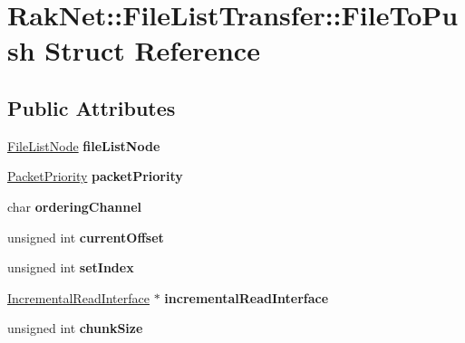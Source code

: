 \hypertarget{struct_rak_net_1_1_file_list_transfer_1_1_file_to_push}{\section{Rak\-Net\-:\-:File\-List\-Transfer\-:\-:File\-To\-Push Struct Reference}
\label{struct_rak_net_1_1_file_list_transfer_1_1_file_to_push}
}
\subsection*{Public Attributes}
\begin{DoxyCompactItemize}
\item 
\hypertarget{struct_rak_net_1_1_file_list_transfer_1_1_file_to_push_a57452c05bc0205c19324ca196ad2d220}{\hyperlink{struct_rak_net_1_1_file_list_node}{File\-List\-Node} {\bfseries file\-List\-Node}}\label{struct_rak_net_1_1_file_list_transfer_1_1_file_to_push_a57452c05bc0205c19324ca196ad2d220}

\item 
\hypertarget{struct_rak_net_1_1_file_list_transfer_1_1_file_to_push_a46d4f493c9ba2cba571182a8ec0f306d}{\hyperlink{_packet_priority_8h_a659378374e516180f93640c79f59705c}{Packet\-Priority} {\bfseries packet\-Priority}}\label{struct_rak_net_1_1_file_list_transfer_1_1_file_to_push_a46d4f493c9ba2cba571182a8ec0f306d}

\item 
\hypertarget{struct_rak_net_1_1_file_list_transfer_1_1_file_to_push_afc2f482993115bae3ebab04ac8a36e74}{char {\bfseries ordering\-Channel}}\label{struct_rak_net_1_1_file_list_transfer_1_1_file_to_push_afc2f482993115bae3ebab04ac8a36e74}

\item 
\hypertarget{struct_rak_net_1_1_file_list_transfer_1_1_file_to_push_a2d357951c882ce02ea2f8489863e24a9}{unsigned int {\bfseries current\-Offset}}\label{struct_rak_net_1_1_file_list_transfer_1_1_file_to_push_a2d357951c882ce02ea2f8489863e24a9}

\item 
\hypertarget{struct_rak_net_1_1_file_list_transfer_1_1_file_to_push_af37a84491394fbf8901036f5af2dd708}{unsigned int {\bfseries set\-Index}}\label{struct_rak_net_1_1_file_list_transfer_1_1_file_to_push_af37a84491394fbf8901036f5af2dd708}

\item 
\hypertarget{struct_rak_net_1_1_file_list_transfer_1_1_file_to_push_aa8dc7a20c2ffda7c091968ea68336496}{\hyperlink{class_rak_net_1_1_incremental_read_interface}{Incremental\-Read\-Interface} $\ast$ {\bfseries incremental\-Read\-Interface}}\label{struct_rak_net_1_1_file_list_transfer_1_1_file_to_push_aa8dc7a20c2ffda7c091968ea68336496}

\item 
\hypertarget{struct_rak_net_1_1_file_list_transfer_1_1_file_to_push_a37d7ceb03914e069ddef32364dae9bb0}{unsigned int {\bfseries chunk\-Size}}\label{struct_rak_net_1_1_file_list_transfer_1_1_file_to_push_a37d7ceb03914e069ddef32364dae9bb0}

\end{DoxyCompactItemize}


